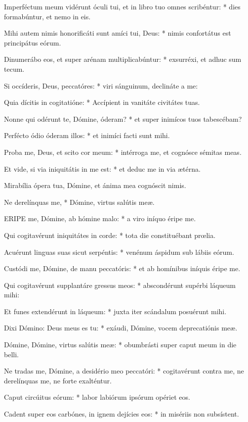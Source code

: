 Imperféctum meum vidérunt óculi tui, et in libro tuo omnes scribéntur: * dies formabúntur, et nemo in eis.

Mihi autem nimis honorificáti sunt amíci tui, Deus: * nimis confortátus est principátus eórum.

Dinumerábo eos, et super arénam multiplicabúntur: * exsurréxi, et adhuc sum tecum.

Si occíderis, Deus, peccatóres: * viri sánguinum, declináte a me:

Quia dícitis in cogitatióne: * Accípient in vanitáte civitátes tuas.

Nonne qui odérunt te, Dómine, óderam? * et super inimícos tuos tabescébam?

Perfécto ódio óderam illos: * et inimíci facti sunt mihi.

Proba me, Deus, et scito cor meum: * intérroga me, et cognósce sémitas meas.

Et vide, si via iniquitátis in me est: * et deduc me in via ætérna.

 Mirabília ópera tua, Dómine, et ánima mea cognóscit nimis.

 Ne derelínquas me, * Dómine, virtus salútis meæ.


\lettrine[lines=2]{E}{RIPE} me, Dómine, ab hómine malo: * a viro iníquo éripe me.

Qui cogitavérunt iniquitátes in corde: * tota die constituébant prœlia.

Acuérunt linguas suas sicut serpéntis: * venénum áspidum sub lábiis eórum.

Custódi me, Dómine, de manu peccatóris: * et ab homínibus iníquis éripe me.

Qui cogitavérunt supplantáre gressus meos: * abscondérunt supérbi láqueum mihi:

Et funes extendérunt in láqueum: * juxta iter scándalum posuérunt mihi.

Dixi Dómino: Deus meus es tu: * exáudi, Dómine, vocem deprecatiónis meæ.

Dómine, Dómine, virtus salútis meæ: * obumbrásti super caput meum in die belli.

Ne tradas me, Dómine, a desidério meo peccatóri: * cogitavérunt contra me, ne derelínquas me, ne forte exalténtur.

Caput circúitus eórum: * labor labiórum ipsórum opériet eos.

Cadent super eos carbónes, in ignem dejícies eos: * in misériis non subsístent.

